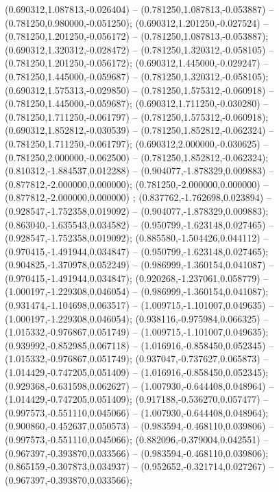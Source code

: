  (0.690312,1.087813,-0.026404) -- (0.781250,1.087813,-0.053887) -- (0.781250,0.980000,-0.051250);
 (0.690312,1.201250,-0.027524) -- (0.781250,1.201250,-0.056172) -- (0.781250,1.087813,-0.053887);
 (0.690312,1.320312,-0.028472) -- (0.781250,1.320312,-0.058105) -- (0.781250,1.201250,-0.056172);
 (0.690312,1.445000,-0.029247) -- (0.781250,1.445000,-0.059687) -- (0.781250,1.320312,-0.058105);
 (0.690312,1.575313,-0.029850) -- (0.781250,1.575312,-0.060918) -- (0.781250,1.445000,-0.059687);
 (0.690312,1.711250,-0.030280) -- (0.781250,1.711250,-0.061797) -- (0.781250,1.575312,-0.060918);
 (0.690312,1.852812,-0.030539) -- (0.781250,1.852812,-0.062324) -- (0.781250,1.711250,-0.061797);
 (0.690312,2.000000,-0.030625) -- (0.781250,2.000000,-0.062500) -- (0.781250,1.852812,-0.062324);
 (0.810312,-1.884537,0.012288) -- (0.904077,-1.878329,0.009883) -- (0.877812,-2.000000,0.000000);
 (0.781250,-2.000000,0.000000) -- (0.877812,-2.000000,0.000000) ;
 (0.837762,-1.762698,0.023894) -- (0.928547,-1.752358,0.019092) -- (0.904077,-1.878329,0.009883);
 (0.863040,-1.635543,0.034582) -- (0.950799,-1.623148,0.027465) -- (0.928547,-1.752358,0.019092);
 (0.885580,-1.504426,0.044112) -- (0.970415,-1.491944,0.034847) -- (0.950799,-1.623148,0.027465);
 (0.904825,-1.370978,0.052249) -- (0.986999,-1.360154,0.041087) -- (0.970415,-1.491944,0.034847);
 (0.920268,-1.237061,0.058779) -- (1.000197,-1.229308,0.046054) -- (0.986999,-1.360154,0.041087);
 (0.931474,-1.104698,0.063517) -- (1.009715,-1.101007,0.049635) -- (1.000197,-1.229308,0.046054);
 (0.938116,-0.975984,0.066325) -- (1.015332,-0.976867,0.051749) -- (1.009715,-1.101007,0.049635);
 (0.939992,-0.852985,0.067118) -- (1.016916,-0.858450,0.052345) -- (1.015332,-0.976867,0.051749);
 (0.937047,-0.737627,0.065873) -- (1.014429,-0.747205,0.051409) -- (1.016916,-0.858450,0.052345);
 (0.929368,-0.631598,0.062627) -- (1.007930,-0.644408,0.048964) -- (1.014429,-0.747205,0.051409);
 (0.917188,-0.536270,0.057477) -- (0.997573,-0.551110,0.045066) -- (1.007930,-0.644408,0.048964);
 (0.900860,-0.452637,0.050573) -- (0.983594,-0.468110,0.039806) -- (0.997573,-0.551110,0.045066);
 (0.882096,-0.379004,0.042551) -- (0.967397,-0.393870,0.033566) -- (0.983594,-0.468110,0.039806);
 (0.865159,-0.307873,0.034937) -- (0.952652,-0.321714,0.027267) -- (0.967397,-0.393870,0.033566);
